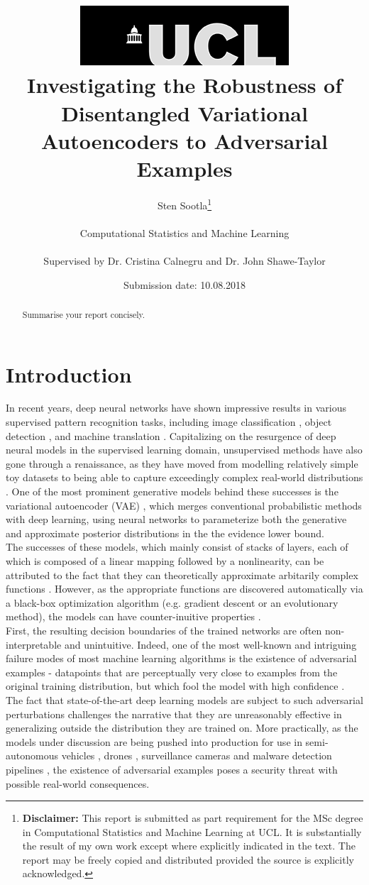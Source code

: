 \documentclass{report}
\title{{ \includegraphics[scale=.5,natwidth=294,natheight=84]{ucl_logo}}\\
{{\Huge Investigating the Robustness of Disentangled Variational Autoencoders to Adversarial Examples}}\\}
\date{Submission date: 10.08.2018}
\author{Sten Sootla\thanks{
{\bf Disclaimer:}
This report is submitted as part requirement for the MSc degree in Computational Statistics and Machine Learning at UCL. It is substantially the result of my own work except where explicitly indicated in the text. The report may be freely copied and distributed provided the source is explicitly acknowledged.}
\\ \\
Computational Statistics and Machine Learning\\ \\
Supervised by Dr. Cristina Calnegru and Dr. John Shawe-Taylor
}
\begin{document}
 
\onehalfspacing
\maketitle
\begin{abstract}
Summarise your report concisely.
\end{abstract}
\tableofcontents
\setcounter{page}{1}


\chapter{Introduction}



\noindent In recent years, deep neural networks have shown impressive results in various supervised pattern recognition tasks, including image classification \cite{alexnet, resnet}, object detection \cite{rcnn}, and machine translation \cite{nmt}. Capitalizing on the resurgence of deep neural models in the supervised learning domain, unsupervised methods have also gone through a renaissance, as they have moved from modelling relatively simple toy datasets to being able to capture exceedingly complex real-world distributions \cite{began, musicvae}. One of the most prominent generative models behind these successes is the variational autoencoder (VAE) \cite{vae}, which merges conventional probabilistic methods with deep learning, using neural networks to parameterize both the generative and approximate posterior distributions in the the evidence lower bound. \\

\noindent The successes of these models, which mainly consist of stacks of layers, each of which is composed of a linear mapping followed by a nonlinearity, can be attributed to the fact that they can theoretically approximate arbitarily complex functions \cite{Cybenko1989}. However, as the appropriate functions are discovered automatically via a black-box optimization algorithm (e.g. gradient descent or an evolutionary method), the models can have counter-inuitive properties \cite{intriguing-properties}. \\

\noindent First, the resulting decision boundaries of the trained networks are often non-interpretable and unintuitive. Indeed, one of the most well-known and intriguing failure modes of most machine learning algorithms is the existence of adversarial examples - datapoints that are perceptually very close to examples from the original training distribution, but which fool the model with high confidence \cite{intriguing-properties}. The fact that state-of-the-art deep learning models are subject to such adversarial perturbations challenges the narrative that they are unreasonably effective in generalizing outside the distribution they are trained on. More practically, as the models under discussion are being pushed into production for use in semi-autonomous vehicles \cite{nvidia-self-driving-cars}, drones \cite{drones}, surveillance cameras \cite{surveillance-cameras} and malware detection pipelines \cite{malware}, the existence of adversarial examples poses a security threat with possible real-world consequences. \\
\end{document}
